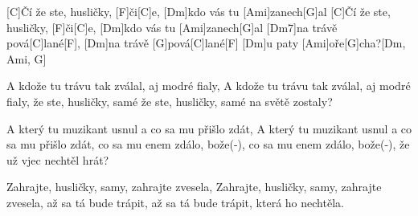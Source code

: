 
[C]Čí že ste, husličky, [F]či[C]e, 
[Dm]kdo vás tu [Ami]zanech[G]al
[C]Čí že ste, husličky, [F]či[C]e, 
[Dm]kdo vás tu [Ami]zanech[G]al
[Dm7]na trávě pová[C]lané[F], 
[Dm]na trávě [G]pová[C]lané[F] 
[Dm]u paty [Ami]oře[G]cha?[Dm, Ami, G]



A kdože tu trávu tak zválal, aj modré fialy,
A kdože tu trávu tak zválal, aj modré fialy,
že ste, husličky, samé 
že ste, husličky, samé na světě zostaly?



A který tu muzikant usnul a co sa mu přišlo zdát,
A který tu muzikant usnul a co sa mu přišlo zdát,
co sa mu enem zdálo, bože(-), 
co sa mu enem zdálo, bože(-), že už vjec nechtěl hrát?



Zahrajte, husličky, samy, zahrajte zvesela,
Zahrajte, husličky, samy, zahrajte zvesela,
až sa tá bude trápit, 
až sa tá bude trápit, která ho nechtěla.


